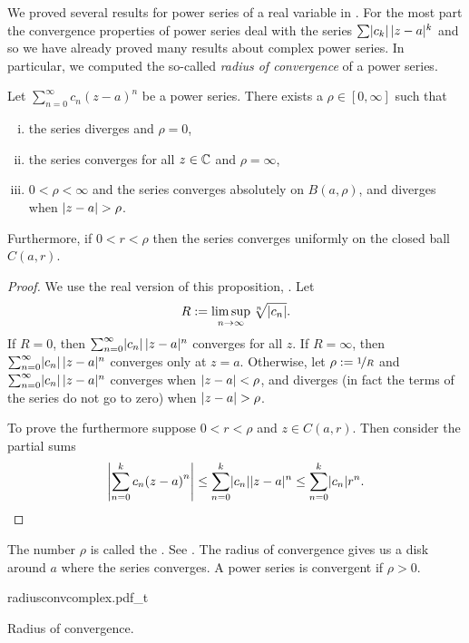 We proved several results for power series of a real variable in
.   For the most part the convergence
properties of power series deal with the series
$\sum \lvert {c_k} \rvert \, \lvert {z-a} \rvert^k$ and so we have already proved many results about complex power
series.  In particular, we computed the so-called
\emph{radius of convergence} of a power series.

\begin{samepage}
\begin{prop}
Let $\sum_{n=0}^\infty c_n {(z-a)}^n$ be a power series.
There exists a $\rho \in [0,\infty]$ such that
\begin{enumerate}[(i)]
\item the series diverges and $\rho = 0$,
\item the series converges for all $z \in {\mathbb{C}}$ and $\rho = \infty$,
\item $0 < \rho < \infty$ and the
series converges absolutely on $B(a,\rho)$,
and diverges when $\lvert {z-a} \rvert > \rho$.
\end{enumerate}
Furthermore, if $0 < r < \rho$ then
the series converges uniformly on the closed ball $C(a,r)$.
\end{prop}
\end{samepage}

\begin{proof}
We use the real version of this proposition,
.
Let
\begin{equation*}
R := \limsup_{n\to\infty} \sqrt[n]{\lvert {c_n} \rvert} .
\end{equation*}
If $R = 0$, then
$\sum_{n=0}^\infty \lvert {c_n} \rvert \, \lvert {z-a} \rvert^n$ converges for all $z$.
If $R = \infty$, then
$\sum_{n=0}^\infty \lvert {c_n} \rvert \, \lvert {z-a} \rvert^n$ converges only at $z=a$.
Otherwise, let $\rho := \nicefrac{1}{R}$ and
$\sum_{n=0}^\infty \lvert {c_n} \rvert \, \lvert {z-a} \rvert^n$ converges when
$\lvert {z-a} \rvert < \rho$, and diverges (in fact the terms of the series
do not go to zero) when $\lvert {z-a} \rvert > \rho$.

To prove the furthermore suppose
$0 < r < \rho$ and $z \in C(a,r)$.  Then
consider the partial sums
\begin{equation*}
\left\lvert {\sum_{n=0}^k c_n {(z-a)}^n} \right\rvert
\leq
\sum_{n=0}^k \lvert {c_n} \rvert \lvert {z-a} \rvert^n
\leq
\sum_{n=0}^k \lvert {c_n} \rvert r^n . \qedhere
\end{equation*}
\end{proof}

The number $\rho$ is called the \emph{}.
See .
The radius of convergence gives us a disk around $a$ where the series converges.  A power series
is convergent if $\rho > 0$.
\begin{myfigureht}
{radiusconvcomplex.pdf_t}
\caption{Radius of convergence.\label{fig:radiusconvcomplex}}
\end{myfigureht}

